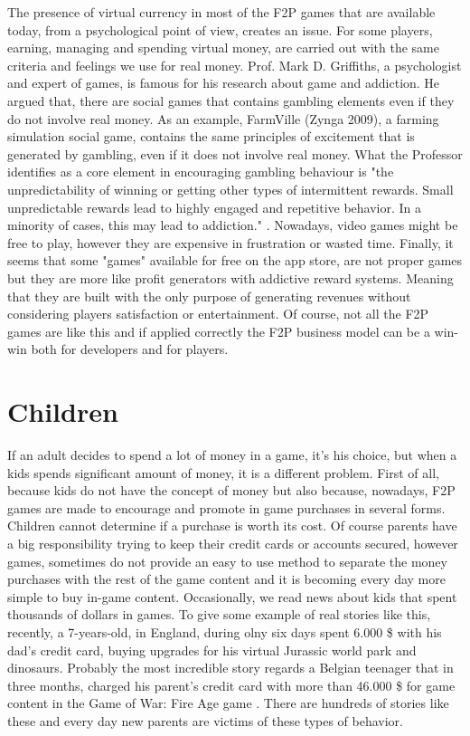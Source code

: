 The presence of virtual currency in most of the F2P games that are available today, from a psychological point of view, creates an issue. For some players, earning, managing and spending virtual money, are carried out with the same criteria and feelings we use for real money. Prof. Mark D. Griffiths, a psychologist and expert of games, is famous for his research about game and addiction. He argued that, there are social games that contains gambling elements even if they do not involve real money. As an example, FarmVille (Zynga 2009), a farming simulation social game, contains the same principles of excitement that is generated by gambling, even if it does not involve real money. What the Professor identifies as a core element in encouraging gambling behaviour is "the unpredictability of winning or getting other types of intermittent rewards. Small unpredictable rewards lead to highly engaged and repetitive behavior. In a minority of cases, this may lead to addiction." \cite{kuss_internet_2012}. Nowadays, video games might be free to play, however they are expensive in frustration or wasted time.  Finally, it seems that some "games" available for free on the app store, are not proper games but they are more like profit generators with addictive reward systems. Meaning that they are built with the only purpose of generating revenues without considering players satisfaction or entertainment. Of course, not all the F2P games are like this and if applied correctly the F2P business model can be a win-win both for developers and for players. 



\section{Children}
If an adult decides to spend a lot of money in a game, it's his choice, but when a kids spends significant amount of money, it is a different problem. First of all, because kids do not have the concept of money but also because, nowadays, F2P games are made to encourage and promote in game purchases in several forms. Children cannot determine if a purchase is worth its cost. Of course parents have a big responsibility trying to keep their credit cards or accounts secured, however games, sometimes do not provide an easy to use method to separate the money purchases with the rest of the game content and it is becoming every day more simple to buy in-game content. Occasionally, we read news about kids that spent thousands of dollars in games. To give some example of real stories like this, recently, a 7-years-old, in England, during olny six days spent 6.000 \$ with his dad's credit card, buying upgrades for his virtual Jurassic world park and dinosaurs. Probably the most incredible story regards a Belgian teenager that in three months, charged his parent's credit card with more than 46.000 \$ for game content in the Game of War: Fire Age game \cite{kelly_kids_????}. There are hundreds of stories like these and every day new parents are victims of these types of behavior. 

